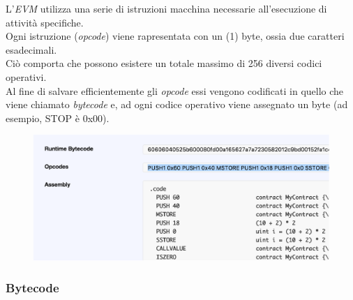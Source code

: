 \documentclass[11pt]{thesistemp}
\begin{document}
L'\textit{EVM} utilizza una serie di istruzioni macchina necessarie all'esecuzione di attività specifiche.\\
Ogni istruzione (\textit{opcode}) viene rapresentata con un (1) byte, ossia due caratteri esadecimali.\\
Ciò comporta che possono esistere un totale massimo di 256 diversi codici operativi.\\
Al fine di salvare efficientemente gli \textit{opcode} essi vengono codificati in quello che viene chiamato \textit{bytecode} e, ad ogni codice operativo viene assegnato un byte (ad esempio, STOP è 0x00).\\
\begin{figure}[h]
    \centering
    \includegraphics[scale=.5]{bytecode-opcode.png}
    \label{fig:bytecode-opcode}
\end{figure}
\linebreak

\subsubsection{Bytecode}
\end{document}
